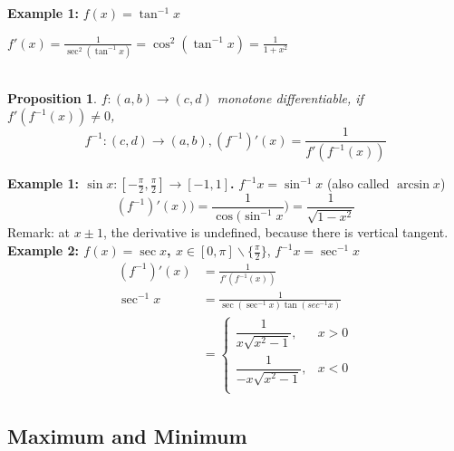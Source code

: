 \documentclass[12pt]{article}
\theoremstyle{plain}
\newtheorem{proposition}{Proposition}[subsection]
\begin{document}
    {\color{Brown}
    \textbf{Example 1: } $f(x)= \tan ^{-1} x$

    $f'(x) = \frac 1{\sec^2 (\tan ^{-1} x)} =\cos ^ 2 (\tan ^{-1} x) =\frac1{1+x^2}$\\\\
    
    }

    \begin{proposition}
    $f:(a,b) \to (c,d)$ monotone differentiable, if $f'(f^{-1}(x))\neq 0$,
    \[
    	f^{-1}:(c,d) \to (a,b), (f^{-1})'(x) = \frac1{f'(f^{-1}(x))}
    \]
		\end{proposition}

    {\color{Brown}\textbf{Example 1: 
    	$\sin x: [-\frac{\pi}2, \frac{\pi}2] \to [-1, 1]$.}
    $f^{-1} x = \sin ^{-1} x$ (also called $\arcsin x$)
    \[
    	(f^{-1})'(x)) = \frac 1{\cos(\sin^{-1}x})=\frac1{\sqrt{1-x^2}}
    \]
    Remark: at $x\pm 1$, the derivative is undefined, 
    because there is vertical tangent.\\

    \textbf{Example 2: 
    $f(x) = \sec x$, $x\in[0,\pi] \backslash \{\frac{\pi}2\}$}, 
    $f^{-1}x = \sec^{-1} x$ 
    \begin{align*}    
        (f^{-1})'(x) &= \frac1{f'(f^{-1}(x))}\\
        \sec^{-1}x &= \frac1{\sec(\sec^{-1}x)\tan(sec^{-1}x)}\\
        &=\begin{cases}
            \dfrac1{x\sqrt{x^2-1}}, &x>0 \\
            \dfrac1{-x\sqrt{x^2-1}}, &x<0 \\
        \end{cases}
    \end{align*}}



		\newpage
    \subsection{Maximum and Minimum}
\end{document}
